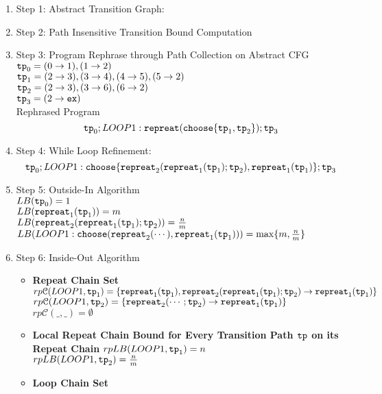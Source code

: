 \begin{enumerate}
  \item Step 1: Abstract Transition Graph:

\item Step 2: Path Insensitive Transition Bound Computation

\item Step 3: Program Rephrase through Path Collection on Abstract CFG
\\
$\mathtt{tp}_0 = (0 \to 1), (1 \to 2)$
\\
$\mathtt{tp}_1 = (2 \to 3), (3 \to 4), (4 \to 5), (5 \to 2)$
\\
$\mathtt{tp}_2 = (2 \to 3), (3 \to 6), (6 \to 2)$
\\
$\mathtt{tp}_3 = (2 \to \mathtt{ex})$
\\
Rephrased Program
\[
\mathtt{tp}_0 ; LOOP1: \mathtt{repreat}(\mathtt{choose}\{\mathtt{tp}_1, \mathtt{tp}_2 \}); \mathtt{tp}_3
\]
\item Step 4: While Loop Refinement:
\[
  \mathtt{tp}_0 ; LOOP1: \mathtt{choose}\{\mathtt{repreat}_2(\mathtt{repreat}_1(\mathtt{tp}_1); \mathtt{tp}_2) , \mathtt{repreat}_1(\mathtt{tp}_1) \}; \mathtt{tp}_3
  \]
\item Step 5: Outside-In Algorithm
\\
$LB(\mathtt{tp}_0) = 1$
\\
$LB(\mathtt{repreat}_1(\mathtt{tp}_1)) = m $
\\
$LB(\mathtt{repreat}_2(\mathtt{repreat}_1(\mathtt{tp}_1); \mathtt{tp}_2)) = \frac{n}{m} $
\\
$LB(LOOP1: \mathtt{choose}(\mathtt{repreat}_2(\cdots), \mathtt{repreat}_1(\mathtt{tp}_1))) 
= \max\{m, \frac{n}{m}\} $
\\
\item Step 6: Inside-Out Algorithm
\begin{itemize}
  \item \textbf{Repeat Chain Set}
  \\
  $rp\mathcal{C}(LOOP1, \mathtt{tp}_1) = \{\mathtt{repreat}_1(\mathtt{tp}_1), \mathtt{repreat}_2(\mathtt{repreat}_1(\mathtt{tp}_1); \mathtt{tp}_2) \to \mathtt{repreat}_1(\mathtt{tp}_1)\}$ \\
  $rp\mathcal{C}(LOOP1, \mathtt{tp}_2) = \{\mathtt{repreat}_2(\cdots; \mathtt{tp}_2) \to \mathtt{repreat}_1(\mathtt{tp}_1)\}$ \\
  $rp\mathcal{C}(\_, \_) = \emptyset$ 
  \item \textbf{{Local Repeat Chain Bound} for Every Transition Path $\mathtt{tp}$ on its Repeat Chain}
  $rpLB(LOOP1, \mathtt{tp}_1) = n$ \\
  $rpLB(LOOP1, \mathtt{tp}_2) = \frac{n}{m}$ 
  \item \textbf{Loop Chain Set}
  \\

\end{itemize}
\end{enumerate}
